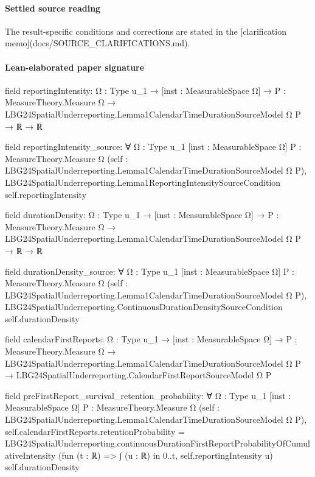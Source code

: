 \documentclass[10pt]{article}
\begin{document}
\paragraph{Settled source reading}
\begin{sloppypar}
The result-\allowbreak{}specific conditions and corrections are stated in the [clarification memo](docs/\allowbreak{}SOURCE\_\allowbreak{}CLARIFICATIONS.\allowbreak{}md).\allowbreak{}
\end{sloppypar}

\paragraph{Lean-elaborated paper signature}
\begin{ReviewVerbatim}
field reportingIntensity:
{Ω : Type u_1} →
  [inst : MeasurableSpace Ω] →
    {P : MeasureTheory.Measure Ω} → LBG24SpatialUnderreporting.Lemma1CalendarTimeDurationSourceModel Ω P → ℝ → ℝ

field reportingIntensity_source:
∀ {Ω : Type u_1} [inst : MeasurableSpace Ω] {P : MeasureTheory.Measure Ω}
  (self : LBG24SpatialUnderreporting.Lemma1CalendarTimeDurationSourceModel Ω P),
  LBG24SpatialUnderreporting.Lemma1ReportingIntensitySourceCondition self.reportingIntensity

field durationDensity:
{Ω : Type u_1} →
  [inst : MeasurableSpace Ω] →
    {P : MeasureTheory.Measure Ω} → LBG24SpatialUnderreporting.Lemma1CalendarTimeDurationSourceModel Ω P → ℝ → ℝ

field durationDensity_source:
∀ {Ω : Type u_1} [inst : MeasurableSpace Ω] {P : MeasureTheory.Measure Ω}
  (self : LBG24SpatialUnderreporting.Lemma1CalendarTimeDurationSourceModel Ω P),
  LBG24SpatialUnderreporting.ContinuousDurationDensitySourceCondition self.durationDensity

field calendarFirstReports:
{Ω : Type u_1} →
  [inst : MeasurableSpace Ω] →
    {P : MeasureTheory.Measure Ω} →
      LBG24SpatialUnderreporting.Lemma1CalendarTimeDurationSourceModel Ω P →
        LBG24SpatialUnderreporting.CalendarFirstReportSourceModel Ω P

field preFirstReport_survival_retention_probability:
∀ {Ω : Type u_1} [inst : MeasurableSpace Ω] {P : MeasureTheory.Measure Ω}
  (self : LBG24SpatialUnderreporting.Lemma1CalendarTimeDurationSourceModel Ω P),
  self.calendarFirstReports.retentionProbability =
    LBG24SpatialUnderreporting.continuousDurationFirstReportProbabilityOfCumulativeIntensity
      (fun (t : ℝ) => ∫ (u : ℝ) in 0..t, self.reportingIntensity u) self.durationDensity
\end{ReviewVerbatim}
\end{document}
